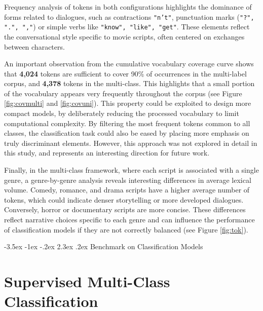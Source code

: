 \documentclass[12pt]{report}
\makeatletter
\renewcommand{\chapter}{\@startsection{chapter}{0}{\z@}
  {-3.5ex \@plus -1ex \@minus -.2ex}
  {2.3ex \@plus.2ex}
  {\normalfont\LARGE\bfseries}}
\makeatother
\begin{document}
Frequency analysis of tokens in both configurations highlights the dominance of forms related to dialogues, such as contractions \texttt{"n't"}, punctuation marks (\texttt{"?", ".", ","}) or simple verbs like \texttt{"know", "like", "get"}. These elements reflect the conversational style specific to movie scripts, often centered on exchanges between characters. 

An important observation from the cumulative vocabulary coverage curve shows that \textbf{4,024} tokens are sufficient to cover 90\% of occurrences in the multi-label corpus, and \textbf{4,378} tokens in the multi-class. This highlights that a small portion of the vocabulary appears very frequently throughout the corpus (see Figure \ref{fig:covmulti} and \ref{fig:covuni}). This property could be exploited to design more compact models, by deliberately reducing the processed vocabulary to limit computational complexity. By filtering the most frequent tokens common to all classes, the classification task could also be eased by placing more emphasis on truly discriminant elements. However, this approach was not explored in detail in this study, and represents an interesting direction for future work.  

Finally, in the multi-class framework, where each script is associated with a single genre, a genre-by-genre analysis reveals interesting differences in average lexical volume. Comedy, romance, and drama scripts have a higher average number of tokens, which could indicate denser storytelling or more developed dialogues. Conversely, horror or documentary scripts are more concise. These differences reflect narrative choices specific to each genre and can influence the performance of classification models if they are not correctly balanced (see Figure \ref{fig:tok}).

\chapter{Benchmark on Classification Models}

\section{Supervised Multi-Class Classification}
\end{document}
